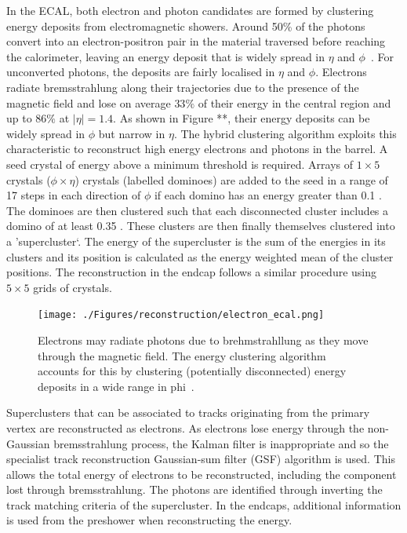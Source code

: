 In the ECAL, both electron and photon candidates are formed by clustering energy deposits
from electromagnetic showers. Around 50\% of the photons convert into an electron-positron 
pair in the material traversed before reaching the calorimeter, leaving an energy deposit that is widely 
spread in $\eta$ and $\phi$~\cite{Argiro:2010zz}.  For unconverted photons, the 
deposits are fairly localised in $\eta$ and $\phi$. Electrons radiate
bremsstrahlung along their trajectories due to the presence of the magnetic field and 
lose on average $33\%$ of their energy in the central region 
and up to $86\%$ at $|\eta| = 1.4$. As shown in Figure **, 
their energy deposits can be widely spread in $\phi$ but narrow in $\eta$. 
The hybrid clustering algorithm exploits this characteristic to
reconstruct high energy electrons and photons in the barrel. A seed crystal of 
energy above a minimum threshold is required. Arrays of $1\times5$ crystals ($\phi\times\eta$)
crystals (labelled dominoes) are added to the seed in a range of 17 steps in each direction of $\phi$
if each domino has an energy greater than 0.1 \GeV. The dominoes are then clustered such that each
disconnected cluster includes a domino of at least 0.35 \GeV. These clusters are then finally themselves
clustered into a 'supercluster`. The energy of the supercluster is the sum of the energies in its clusters
and its position is calculated as the energy weighted mean of the cluster positions.
The reconstruction in the endcap follows a similar procedure 
using $5\times5$ grids of crystals. 

\begin{figure}
\centering
    \texttt{[image: ./Figures/reconstruction/electron\_ecal.png]}
  \caption{\label{fig:ele_ecal} Electrons may radiate photons due to brehmstrahllung as they
  move through the magnetic field. The energy clustering algorithm accounts for this by clustering (potentially 
  disconnected) energy deposits in a wide range in phi~\cite{Argiro:2010zz}.
  }
\end{figure}

Superclusters that can be associated to tracks originating from the primary vertex are reconstructed as electrons.
As electrons lose energy through the non-Gaussian bremsstrahlung process, the Kalman filter is inappropriate and
so the specialist track reconstruction Gaussian-sum filter (GSF) algorithm is used. This allows the total energy of
electrons to be reconstructed, including the component lost through bremsstrahlung. The photons are identified 
through inverting the track matching criteria of the supercluster. In the endcaps, additional information
is used from the preshower when reconstructing the energy.

